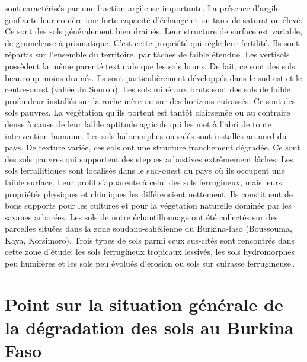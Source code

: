 \documentclass[a4paper,11pt]{article}
\begin{document}
sont caractérisés par une fraction argileuse importante. La présence
d’argile gonflante leur confère une forte capacité d’échange et un
taux de saturation élevé. Ce sont des sols généralement bien
drainés. Leur structure de surface est variable, de grumeleuse à
prismatique. C’est cette propriété qui règle leur fertilité. Ils sont
répartis sur l’ensemble du territoire, par tâches de faible
étendue. Les vertisols possèdent la même parenté texturale que les
sols bruns. De fait, ce sont des sols beaucoup moins drainés. Ils sont
particulièrement développés dans le sud-est et le centre-ouest (vallée
du Sourou). Les sols minéraux bruts sont des sols de faible profondeur
installés sur la roche-mère ou sur des horizons cuirassés. Ce sont des
sols pauvres. La végétation qu’ils portent est tantôt clairsemée ou au
contraire dense à cause de leur faible aptitude agricole qui les met à
l’abri de toute intervention humaine. Les sols halomorphes ou salés
sont installés au nord du pays. De texture variée, ces sols ont une
structure franchement dégradée. Ce sont des sols pauvres qui
supportent des steppes arbustives extrêmement lâches. Les sols
ferrallitiques sont localisés dans le sud-ouest du pays où ils
occupent une faible surface. Leur profil s’apparente à celui des sols
ferrugineux, mais leurs propriétés physiques et chimiques les
différencient nettement. Ils constituent de bons supports pour les
cultures et pour la végétation naturelle dominée par les savanes
arborées. Les sols de notre échantillonnage ont été collectés sur des
parcelles situées dans la zone soudano-sahélienne du Burkina-faso
(Boussouma, Kaya, Korsimoro). Trois types de sols parmi ceux
sus-cités sont rencontrés dans cette zone d'étude: les sols
ferrugineux tropicaux lessivés, les sols hydromorphes peu humifères
et les sols peu évolués d'érosion ou sols sur cuirasse
ferrugineuse\,\cite{TIROGO_2017}.

\section{Point sur la situation générale de la dégradation des sols au Burkina Faso}
\end{document}
